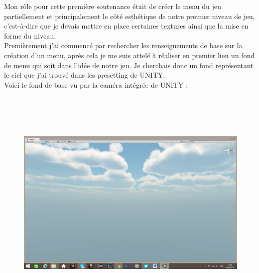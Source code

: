 \documentclass[a4paper]{article}
\begin{document}
Mon rôle pour cette première soutenance était de créer le menu du jeu partiellement et principalement le côté esthétique de notre premier niveau de jeu, c’est-à-dire que je devais mettre en place certaines textures ainsi que la mise en forme du niveau. \\Premièrement j’ai commencé par rechercher les renseignements de base sur la création d’un menu, après cela je me suis attelé à réaliser en premier lieu un fond de menu qui soit dans l’idée de notre jeu. Je cherchais donc un fond représentant le ciel que j’ai trouvé dans les presetting de UNITY.\\Voici le fond de base vu par la caméra intégrée de UNITY :\\ \\ \\ \\ \\
\begin{figure}[h]
\begin{center}
\includegraphics[width=1\textwidth]{sky1.png}
\end{center}
\end{figure}
\end{document}
